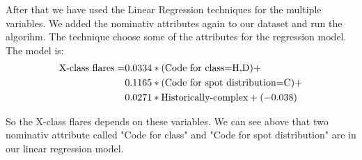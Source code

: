 \documentclass[a4paper]{article}
\begin{document}
After that we have used the Linear Regression techniques for the multiple variables. We added the nominativ attributes again to our dataset and run the algorihm. The technique choose some of the attributes for the regression model. The model is:
\begin{align*}
\textnormal{X-class flares} =& 0.0334 * \textnormal{(Code for class=H,D)} +\\
                             &0.1165 * \textnormal{(Code for spot distribution=C)} +\\
                             &0.0271 * \textnormal{Historically-complex} + (-0.038)
\end{align*}

So the X-class flares depends on these variables. We can see above that two nominativ attribute called "Code for class" and "Code for spot distribution" are in our linear regression model.
\end{document}
